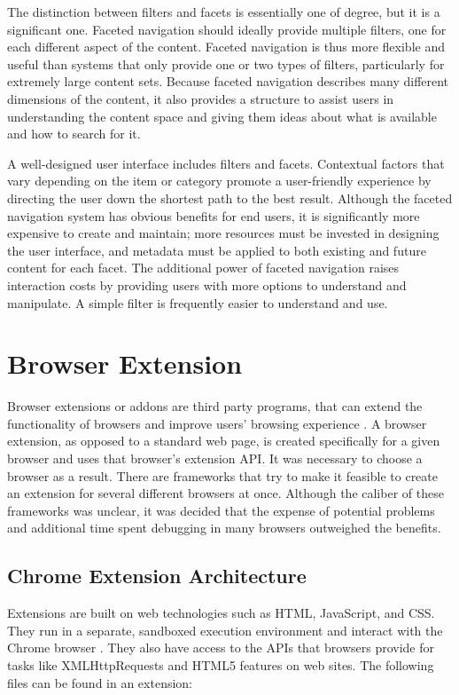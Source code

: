 The distinction between filters and facets is essentially one of degree, but it is a significant one. Faceted navigation should ideally provide multiple filters, one for each different aspect of the content. Faceted navigation is thus more flexible and useful than systems that only provide one or two types of filters, particularly for extremely large content sets. Because faceted navigation describes many different dimensions of the content, it also provides a structure to assist users in understanding the content space and giving them ideas about what is available and how to search for it.

A well-designed user interface includes filters and facets. Contextual factors that vary depending on the item or category promote a user-friendly experience by directing the user down the shortest path to the best result. Although the faceted navigation system has obvious benefits for end users, it is significantly more expensive to create and maintain; more resources must be invested in designing the user interface, and metadata must be applied to both existing and future content for each facet. The additional power of faceted navigation raises interaction costs by providing users with more options to understand and manipulate. A simple filter is frequently easier to understand and use.


\section{Browser Extension}
Browser extensions or addons are third party programs, that can extend the functionality of browsers and improve users' browsing experience \autocite{some2019empoweb}. A browser extension, as opposed to a standard web page, is created specifically for a given browser and uses that browser's extension API. It was necessary to choose a browser as a result. There are frameworks that try to make it feasible to create an extension for several different browsers at once. Although the caliber of these frameworks was unclear, it was decided that the expense of potential problems and additional time spent debugging in many browsers outweighed the benefits.

\subsection{Chrome Extension Architecture}
Extensions are built on web technologies such as HTML, JavaScript, and CSS. They run in a separate, sandboxed execution environment and interact with the Chrome browser \autocite{google2021what}. They also have access to the APIs that browsers provide for tasks like XMLHttpRequests and HTML5 features on web sites. The following files can be found in an extension:

